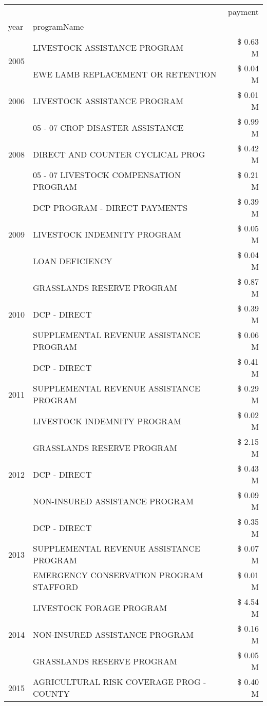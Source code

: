 \begin{tabular}{llr}
\toprule
 &  & payment \\
year & programName &  \\
\midrule
\multirow[t]{2}{*}{2005} & LIVESTOCK ASSISTANCE PROGRAM & \$ 0.63 M \\
 & EWE LAMB REPLACEMENT OR RETENTION & \$ 0.04 M \\
\cline{1-3}
2006 & LIVESTOCK ASSISTANCE PROGRAM & \$ 0.01 M \\
\cline{1-3}
\multirow[t]{3}{*}{2008} & 05 - 07 CROP DISASTER ASSISTANCE & \$ 0.99 M \\
 & DIRECT AND COUNTER CYCLICAL PROG & \$ 0.42 M \\
 & 05 - 07 LIVESTOCK COMPENSATION PROGRAM & \$ 0.21 M \\
\cline{1-3}
\multirow[t]{3}{*}{2009} & DCP PROGRAM - DIRECT PAYMENTS & \$ 0.39 M \\
 & LIVESTOCK INDEMNITY PROGRAM & \$ 0.05 M \\
 & LOAN DEFICIENCY & \$ 0.04 M \\
\cline{1-3}
\multirow[t]{3}{*}{2010} & GRASSLANDS RESERVE PROGRAM & \$ 0.87 M \\
 & DCP - DIRECT & \$ 0.39 M \\
 & SUPPLEMENTAL REVENUE ASSISTANCE PROGRAM & \$ 0.06 M \\
\cline{1-3}
\multirow[t]{3}{*}{2011} & DCP - DIRECT & \$ 0.41 M \\
 & SUPPLEMENTAL REVENUE ASSISTANCE PROGRAM & \$ 0.29 M \\
 & LIVESTOCK INDEMNITY PROGRAM & \$ 0.02 M \\
\cline{1-3}
\multirow[t]{3}{*}{2012} & GRASSLANDS RESERVE PROGRAM & \$ 2.15 M \\
 & DCP - DIRECT & \$ 0.43 M \\
 & NON-INSURED ASSISTANCE PROGRAM & \$ 0.09 M \\
\cline{1-3}
\multirow[t]{3}{*}{2013} & DCP - DIRECT & \$ 0.35 M \\
 & SUPPLEMENTAL REVENUE ASSISTANCE PROGRAM & \$ 0.07 M \\
 & EMERGENCY CONSERVATION PROGRAM STAFFORD & \$ 0.01 M \\
\cline{1-3}
\multirow[t]{3}{*}{2014} & LIVESTOCK FORAGE PROGRAM & \$ 4.54 M \\
 & NON-INSURED ASSISTANCE PROGRAM & \$ 0.16 M \\
 & GRASSLANDS RESERVE PROGRAM & \$ 0.05 M \\
\cline{1-3}
\multirow[t]{3}{*}{2015} & AGRICULTURAL RISK COVERAGE PROG - COUNTY & \$ 0.40 M \\

\end{tabular}

